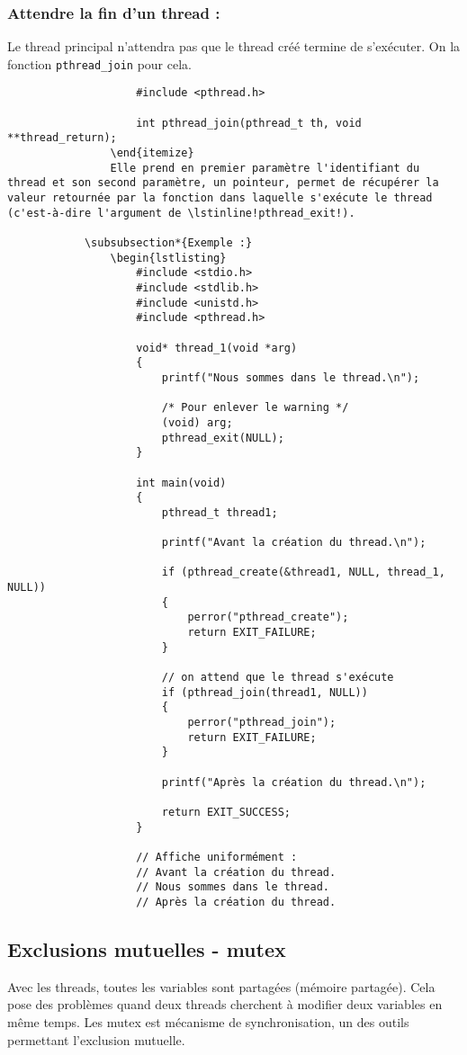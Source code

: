 			\subsubsection*{Attendre la fin d'un thread :}
				Le thread principal n'attendra pas que le thread créé termine de s'exécuter. On la fonction \lstinline!pthread_join! pour cela.
				\begin{lstlisting}
					#include <pthread.h>

					int pthread_join(pthread_t th, void **thread_return);
				\end{itemize}
				Elle prend en premier paramètre l'identifiant du thread et son second paramètre, un pointeur, permet de récupérer la valeur retournée par la fonction dans laquelle s'exécute le thread (c'est-à-dire l'argument de \lstinline!pthread_exit!).

			\subsubsection*{Exemple :}
				\begin{lstlisting}
					#include <stdio.h>
					#include <stdlib.h>
					#include <unistd.h>
					#include <pthread.h>

					void* thread_1(void *arg)
					{
						printf("Nous sommes dans le thread.\n");

						/* Pour enlever le warning */
						(void) arg;
						pthread_exit(NULL);
					}

					int main(void)
					{
						pthread_t thread1;

						printf("Avant la création du thread.\n");

						if (pthread_create(&thread1, NULL, thread_1, NULL)) 
						{
							perror("pthread_create");
							return EXIT_FAILURE;
						}
						
						// on attend que le thread s'exécute
						if (pthread_join(thread1, NULL)) 
						{
							perror("pthread_join");
							return EXIT_FAILURE;
						}

						printf("Après la création du thread.\n");

						return EXIT_SUCCESS;
					}
					
					// Affiche uniformément :
					// Avant la création du thread.
					// Nous sommes dans le thread.
					// Après la création du thread.
				\end{lstlisting}
				
				
		\subsection{Exclusions mutuelles - mutex}
			Avec les threads, toutes les variables sont partagées (mémoire partagée). Cela pose des problèmes quand deux threads cherchent à modifier deux variables en même temps. Les mutex est mécanisme de synchronisation, un des outils permettant l'exclusion mutuelle.
			
